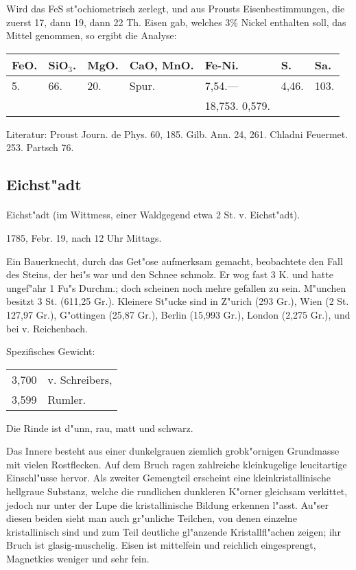 \documentclass[a4paper, 11pt, oneside]{article}
\begin{document}
Wird das FeS st"ochiometrisch zerlegt, und aus Prousts Eisenbestimmungen, die zuerst 17, dann 19, dann 22 Th. Eisen gab, welches 3\% Nickel enthalten soll, das Mittel genommen, so ergibt die Analyse:
\begin{table}[!ht]
    \centering
    \begin{tabular}{l l l l l l l}
        FeO. & SiO$_{3}$. & MgO. & CaO, MnO. & Fe-Ni. & S. & Sa. \\ \hline
        5. & 66. & 20. & Spur. & 7,54.--- & 4,46. & 103. \\
         &  &  &  & 18,753. 0,579. &  &
    \end{tabular}
\end{table}

\footnotesize
Literatur: Proust Journ. de Phys. 60, 185. Gilb. Ann. 24, 261. Chladni Feuermet. 253. Partsch 76.
\subsection{Eichst"adt}
\normalsize
\paragraph{}
Eichst"adt (im Wittmess, einer Waldgegend etwa 2 St. v. Eichst"adt).

1785, Febr. 19, nach 12 Uhr Mittags.

Ein Bauerknecht, durch das Get"ose aufmerksam gemacht, beobachtete den Fall des Steins, der hei"s war und den Schnee schmolz. Er wog fast 3 K. und hatte ungef"ahr 1 Fu"s Durchm.; doch scheinen noch mehre gefallen zu sein. M"unchen besitzt 3 St. (611,25 Gr.). Kleinere St"ucke sind in Z"urich (293 Gr.), Wien (2 St. 127,97 Gr.), G"ottingen (25,87 Gr.), Berlin (15,993 Gr.), London (2,275 Gr.), und bei v. Reichenbach.

Spezifisches Gewicht:
\begin{table}[!ht]
    \centering
    \begin{tabular}{l l}
        3,700 & v. Schreibers,\\
        3,599 & Rumler.
    \end{tabular}
\end{table}

Die Rinde ist d"unn, rau, matt und schwarz.

Das Innere besteht aus einer dunkelgrauen ziemlich grobk"ornigen Grundmasse mit vielen Rostflecken. Auf dem Bruch ragen zahlreiche kleinkugelige leucitartige Einschl"usse hervor. Als zweiter Gemengteil erscheint eine kleinkristallinische hellgraue Substanz, welche die rundlichen dunkleren K"orner gleichsam verkittet, jedoch nur unter der Lupe die kristallinische Bildung erkennen l"asst. Au"ser diesen beiden sieht man auch gr"unliche Teilchen, von denen einzelne kristallinisch sind und zum Teil deutliche gl"anzende Kristallfl"achen zeigen; ihr Bruch ist glasig-muschelig. Eisen ist mittelfein und reichlich eingesprengt, Magnetkies weniger und sehr fein.
\end{document}
